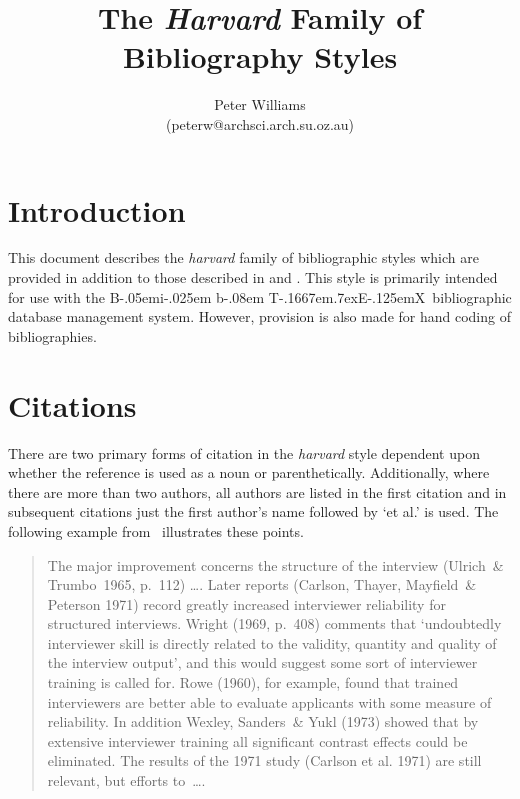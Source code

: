 \def\BibTeX{{\rm B\kern-.05em{\sc i\kern-.025em b}\kern-.08em
    T\kern-.1667em\lower.7ex\hbox{E}\kern-.125emX}}

\title{The {\em Harvard} Family of Bibliography Styles}
\author{Peter Williams \\ (peterw@archsci.arch.su.oz.au)}


\maketitle
\section{Introduction}
This document describes the {\em harvard} family of bibliographic styles which
are provided in addition to those described in  and .
This style is primarily intended for use with the \BibTeX\ bibliographic
database management system.
However, provision is also made for hand coding of bibliographies.
\section{Citations}
There are two primary forms of citation in the {\em harvard} style dependent
upon whether the reference is used as a noun or parenthetically.
Additionally, where there are more than two authors, all authors are listed in
the first citation and in subsequent citations just the first author's name
followed by `et al.' is used.
The following example from \ illustrates these points.
\begin{quote}
The major improvement concerns the structure of the interview
(Ulrich~\& Trumbo~1965, p.~112) \ldots .
Later reports (Carlson, Thayer, Mayfield~\& Peterson 1971) record greatly 
increased interviewer reliability for structured interviews.
Wright (1969, p.~408) comments that `undoubtedly interviewer skill is
directly related to the validity, quantity and quality of the interview output',
and this would suggest some sort of interviewer training is called for.
Rowe (1960), for example, found that trained interviewers are better able to
evaluate applicants with some measure of reliability.
In addition Wexley, Sanders~\& Yukl (1973) showed that by extensive interviewer
training all significant contrast effects could be eliminated.
The results of the 1971 study (Carlson et al. 1971) are still relevant, but
efforts to~\ldots.
\end{quote}

